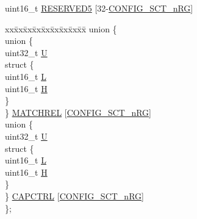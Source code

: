 \begin{DoxyCompactItemize}
\begin{tabbing}
\end{tabbing}\item 
uint16\+\_\+t \hyperlink{struct_l_p_c___s_c_t___t_a63a020f17db842142d6fa33afea05f8b}{R\+E\+S\+E\+R\+V\+E\+D5} \mbox{[}32-\/\hyperlink{group___s_c_t__18_x_x__43_x_x_ga8d80e251208a01483a6b00c81ecb7493}{C\+O\+N\+F\+I\+G\+\_\+\+S\+C\+T\+\_\+n\+RG}\mbox{]}
\item 
\begin{tabbing}
xx\=xx\=xx\=xx\=xx\=xx\=xx\=xx\=xx\=\kill
union \{\\
\>union \{\\
\>\>uint32\_t \hyperlink{struct_l_p_c___s_c_t___t_aa12d7d1d2c95315549032b6e19db5d03}{U}\\
\>\>struct \{\\
\>\>\>uint16\_t \hyperlink{struct_l_p_c___s_c_t___t_aa5ab268b51e8f1f09f30dfb58369b22a}{L}\\
\>\>\>uint16\_t \hyperlink{struct_l_p_c___s_c_t___t_a38e1d5c4c9e43fb6422619272bff5838}{H}\\
\>\>\} \\
\>\} \hyperlink{struct_l_p_c___s_c_t___t_ac51a24aa2415befac5b95ad899ccdc22}{MATCHREL} \mbox{[}\hyperlink{group___s_c_t__18_x_x__43_x_x_ga8d80e251208a01483a6b00c81ecb7493}{CONFIG\_SCT\_nRG}\mbox{]}\\
\>union \{\\
\>\>uint32\_t \hyperlink{struct_l_p_c___s_c_t___t_aa12d7d1d2c95315549032b6e19db5d03}{U}\\
\>\>struct \{\\
\>\>\>uint16\_t \hyperlink{struct_l_p_c___s_c_t___t_aa5ab268b51e8f1f09f30dfb58369b22a}{L}\\
\>\>\>uint16\_t \hyperlink{struct_l_p_c___s_c_t___t_a38e1d5c4c9e43fb6422619272bff5838}{H}\\
\>\>\} \\
\>\} \hyperlink{struct_l_p_c___s_c_t___t_a4db84af44abde11a6e346edfd8ec781e}{CAPCTRL} \mbox{[}\hyperlink{group___s_c_t__18_x_x__43_x_x_ga8d80e251208a01483a6b00c81ecb7493}{CONFIG\_SCT\_nRG}\mbox{]}\\
\}; \\


\end{tabbing}
\end{DoxyCompactItemize}
